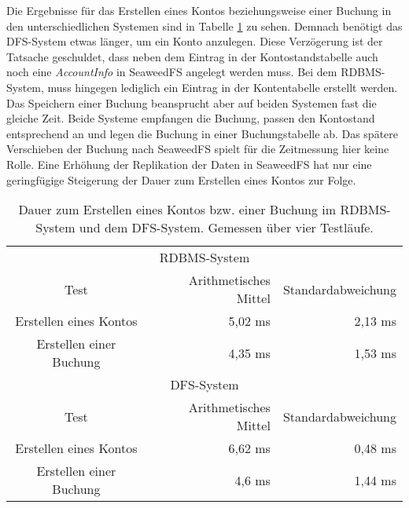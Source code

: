 \documentclass[12pt,oneside,a4paper,parskip]{scrbook}
\begin{document}
Die Ergebnisse für das Erstellen eines Kontos beziehungsweise einer Buchung in den unterschiedlichen Systemen sind in Tabelle \ref{tab:create} zu sehen. Demnach benötigt das DFS-System etwas länger, um ein Konto anzulegen. Diese Verzögerung ist der Tatsache geschuldet, dass neben dem Eintrag in der Kontostandstabelle auch noch eine \textit{AccountInfo} in SeaweedFS angelegt werden muss. Bei dem RDBMS-System, muss hingegen lediglich ein Eintrag in der Kontentabelle erstellt werden. Das Speichern einer Buchung beansprucht aber auf beiden Systemen fast die gleiche Zeit. Beide Systeme empfangen die Buchung, passen den Kontostand entsprechend an und legen die Buchung in einer Buchungstabelle ab. Das spätere Verschieben der Buchung nach SeaweedFS spielt für die Zeitmessung hier keine Rolle. Eine Erhöhung der Replikation der Daten in SeaweedFS hat nur eine geringfügige Steigerung der Dauer zum Erstellen eines Kontos zur Folge.

\begin{table}[h]
\centering %
\begin{tabular}{c rr} 
\multicolumn{3}{c}{RDBMS-System}\\
Test & Arithmetisches Mittel & Standardabweichung  \\ [0.5ex]
\hline %
Erstellen eines Kontos & 5,02 ms& 2,13 ms\\ %
Erstellen einer Buchung & 4,35 ms& 1,53 ms\\
\hline\hline %

\multicolumn{3}{c}{DFS-System}\\
Test & Arithmetisches Mittel & Standardabweichung  \\ [0.5ex]
\hline %
Erstellen eines Kontos & 6,62 ms& 0,48 ms\\ %
Erstellen einer Buchung & 4,6 ms& 1,44 ms\\

\end{tabular}
\label{tab:create}
\caption{Dauer zum Erstellen eines Kontos bzw. einer Buchung im RDBMS-System und dem DFS-System. Gemessen über vier Testläufe.}
\end{table}
\end{document}
